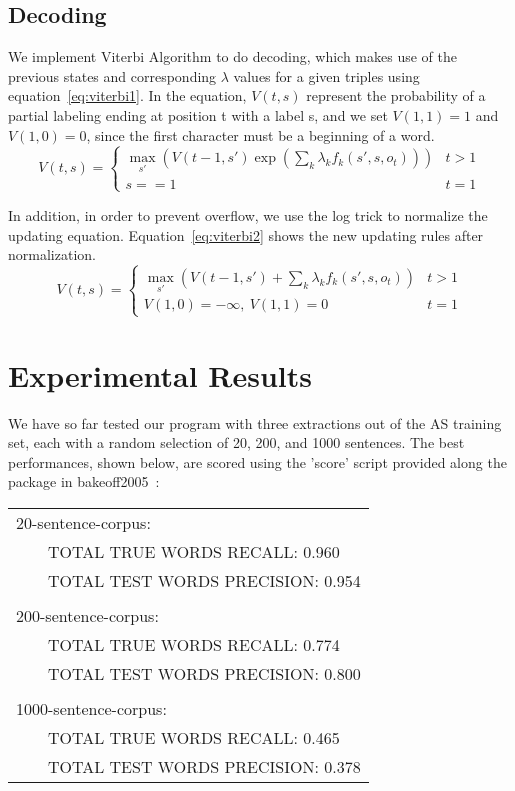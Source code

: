 \documentclass[UTF8,11pt]{article}
\begin{document}
\subsection{Decoding}
\noindent We implement Viterbi Algorithm to do decoding, which makes use of the previous states and corresponding $\lambda$ values for a given triples using equation~\ref{eq:viterbi1}. In the equation, $V(t, s)$ represent the probability of a partial labeling ending at position t with a label s, and we set $V(1, 1) = 1$ and $V(1, 0) = 0$, since the first character must be a beginning of a word.
\begin{equation} \label{eq:viterbi1}
V(t, s) = \left\{ \begin{array}{lc}
\max_{s'}( V(t-1, s') \exp \left( \sum_k \lambda_k f_k(s', s, o_t) \right) ) & t>1 \\
s==1 & t=1
\end{array} \right.
\end{equation}

In addition, in order to prevent overflow, we use the log trick to normalize the updating equation. Equation~\ref{eq:viterbi2} shows the new updating rules after normalization.
\begin{equation} \label{eq:viterbi2}
V(t, s) = \left\{ \begin{array}{lc}
\max_{s'}( V(t-1, s') + \sum_k \lambda_k f_k(s', s, o_t) ) & t>1 \\
V(1,0) = -\infty,\ V(1, 1) = 0 & t=1
\end{array} \right.
\end{equation}

\section{Experimental Results}
\noindent We have so far tested our program with three extractions out of the AS training set, each with a random selection of 20, 200, and 1000 sentences. The best performances, shown below, are scored using the 'score' script provided along the package in bakeoff2005~\cite{bakeoff_data}:
\begin{center}
\begin{tabular}{ll}
20-sentence-corpus: & \\
\multicolumn{2}{l}{~~~~TOTAL TRUE WORDS RECALL: 0.960} \\
\multicolumn{2}{l}{~~~~TOTAL TEST WORDS PRECISION: 0.954} \\
\\
200-sentence-corpus: & \\
\multicolumn{2}{l}{~~~~TOTAL TRUE WORDS RECALL: 0.774} \\
\multicolumn{2}{l}{~~~~TOTAL TEST WORDS PRECISION: 0.800} \\
\\
1000-sentence-corpus: & \\
\multicolumn{2}{l}{~~~~TOTAL TRUE WORDS RECALL: 0.465} \\
\multicolumn{2}{l}{~~~~TOTAL TEST WORDS PRECISION: 0.378} \\
\end{tabular}
\end{center}
\end{document}
